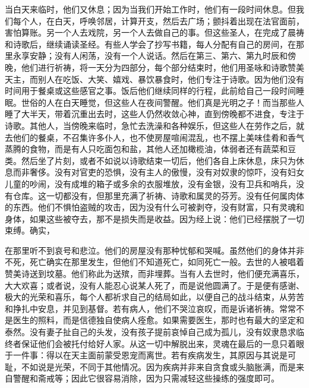 当白天来临时，他们又休息；因为当我们开始工作时，他们有一段时间休息。但我们每个人，在白天，呼唤邻居，计算开支，然后去广场；颤抖着出现在法官面前，害怕算账。另一个人去戏院，另一个人去做自己的事。但这些圣人，在完成了晨祷和诗歌后，继续诵读圣经。有些人学会了抄写书籍，每人分配有自己的房间，在那里永享安静；没有人闲荡，没有一个人说话。然后在第三、第六、第九时辰和傍晚，他们进行祈祷，将一天分为四部分，每个部分结束时，他们用圣咏和诗歌赞美天主，而别人在吃饭、大笑、嬉戏、暴饮暴食时，他们专注于诗歌。因为他们没有时间用于餐桌或这些感官之事。饭后他们继续同样的行程，此前给自己一段时间睡眠。世俗的人在白天睡觉，但这些人在夜间警醒。他们真是光明之子！而当那些人睡了大半天，带着沉重出去时，这些人仍然收敛心神，直到傍晚都不进食，专注于诗歌。其他人，当傍晚来临时，急忙去洗澡和各种娱乐，但这些人在劳作之后，就去他们的餐桌，不召集许多仆人，也不使房屋喧闹混乱，也不摆上美味佳肴和香气蒸腾的食物，而是有人只吃面包和盐，其他人还加橄榄油，体弱者还有蔬菜和豆类。然后坐了片刻，或者不如说以诗歌结束一切后，他们各自上床休息，床只为休息而非奢侈。没有对官吏的恐惧，没有主人的傲慢，没有对奴隶的惊吓，没有妇女儿童的吵闹，没有成堆的箱子或多余的衣服堆放，没有金银，没有卫兵和哨兵，没有仓库。这一切都没有，但那里充满了祈祷、诗歌和属灵的芬芳。没有任何属肉体的东西。他们不惧怕盗贼的攻击，因为没有什么可被剥夺，没有财富，只有灵魂和身体，如果这些被夺去，那不是损失而是收益。因为经上说：他们已经摆脱了一切束缚。确实，\par

在那里听不到哀号和悲泣。他们的房屋没有那种忧郁和哭喊。虽然他们的身体并非不死，死亡确实在那里发生，但他们不知道死亡，如同死亡一般。去世的人被唱着赞美诗送到坟墓。他们称此为送殡，而非埋葬。当有人去世时，他们便充满喜乐，大大欢喜；或者说，没有人能忍心说某人死了，而是说他圆满了。于是便有感谢、极大的光荣和喜乐，每个人都祈求自己的结局如此，以便自己的战斗结束，从劳苦和挣扎中安息，并见到基督。若有病人，他们不哭泣哀叹，而是诉诸祈祷。常常不是医生的照料，而是信德独自使病人痊愈。如果需要医生，那时也有最大的坚定和泰然。没有妻子扯自己的头发，没有孩子提前哀悼自己成为孤儿，没有奴隶恳求临终者保证他们会被托付给好人家。从这一切中解脱出来，灵魂在最后的一息只着眼于一件事：得以在天主面前蒙受恩宠而离世。若有疾病发生，其原因与其说是可耻，不如说是光荣，不同于其他情况。因为疾病并非来自贪食或头脑胀满，而是来自警醒和斋戒等；因此它很容易消除，因为只需减轻这些操练的强度即可。\par


